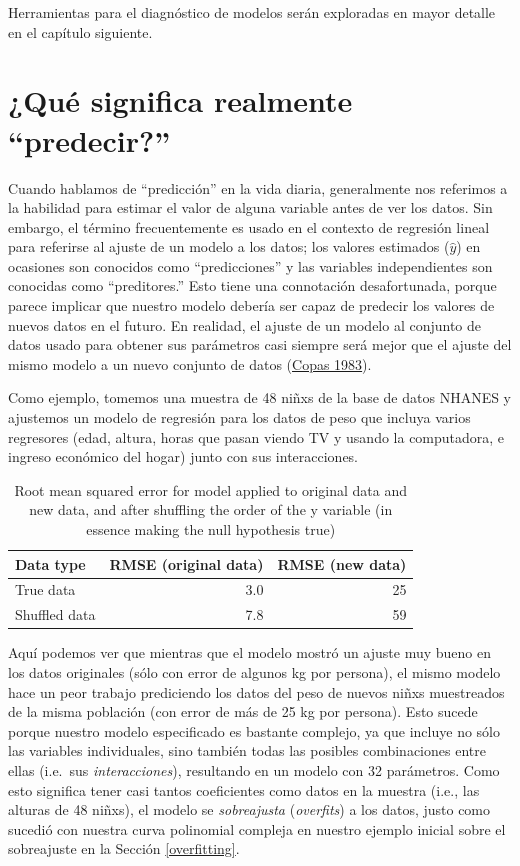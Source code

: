 \documentclass[
  12pt,
]{book}
\begin{document}
Herramientas para el diagnóstico de modelos serán exploradas en mayor detalle en el capítulo siguiente.

\hypertarget{quuxe9-significa-realmente-predecir}{%
\section{¿Qué significa realmente ``predecir?''}\label{quuxe9-significa-realmente-predecir}}

Cuando hablamos de ``predicción'' en la vida diaria, generalmente nos referimos a la habilidad para estimar el valor de alguna variable antes de ver los datos. Sin embargo, el término frecuentemente es usado en el contexto de regresión lineal para referirse al ajuste de un modelo a los datos; los valores estimados (\(\hat{y}\)) en ocasiones son conocidos como ``predicciones'' y las variables independientes son conocidas como ``preditores.'' Esto tiene una connotación desafortunada, porque parece implicar que nuestro modelo debería ser capaz de predecir los valores de nuevos datos en el futuro. En realidad, el ajuste de un modelo al conjunto de datos usado para obtener sus parámetros casi siempre será mejor que el ajuste del mismo modelo a un nuevo conjunto de datos (\protect\hyperlink{ref-copa:1983}{Copas 1983}).

Como ejemplo, tomemos una muestra de 48 niñxs de la base de datos NHANES y ajustemos un modelo de regresión para los datos de peso que incluya varios regresores (edad, altura, horas que pasan viendo TV y usando la computadora, e ingreso económico del hogar) junto con sus interacciones.

\begin{table}

\caption{\label{tab:unnamed-chunk-102}Root mean squared error for model applied to original data and new data, and after shuffling the order of the y variable (in essence making the null hypothesis true)}
\centering
\begin{tabular}[t]{l|r|r}
\hline
Data type & RMSE (original data) & RMSE (new data)\\
\hline
True data & 3.0 & 25\\
\hline
Shuffled data & 7.8 & 59\\
\hline
\end{tabular}
\end{table}

Aquí podemos ver que mientras que el modelo mostró un ajuste muy bueno en los datos originales (sólo con error de algunos kg por persona), el mismo modelo hace un peor trabajo prediciendo los datos del peso de nuevos niñxs muestreados de la misma población (con error de más de 25 kg por persona). Esto sucede porque nuestro modelo especificado es bastante complejo, ya que incluye no sólo las variables individuales, sino también todas las posibles combinaciones entre ellas (i.e.~sus \emph{interacciones}), resultando en un modelo con 32 parámetros. Como esto significa tener casi tantos coeficientes como datos en la muestra (i.e., las alturas de 48 niñxs), el modelo se \emph{sobreajusta} (\emph{overfits}) a los datos, justo como sucedió con nuestra curva polinomial compleja en nuestro ejemplo inicial sobre el sobreajuste en la Sección \ref{overfitting}.
\end{document}
